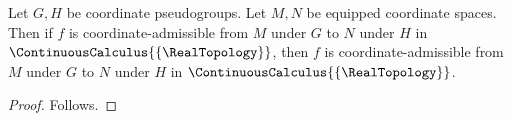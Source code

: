 


\begin{theorem}\label{coordinate_map_closed_calculus_probe}
    Let $G,H$ be coordinate pseudogroups.
    Let $M,N$ be equipped coordinate spaces.
    Then if $f$ is coordinate-admissible from $M$ under $G$ to $N$ under $H$
        in $\ContinuousCalculus{\{\RealTopology\}}$,
        then $f$ is coordinate-admissible from $M$ under $G$ to $N$ under $H$
        in $\ContinuousCalculus{\{\RealTopology\}}$.
\end{theorem}
\begin{proof}
    Follows.
\end{proof}
